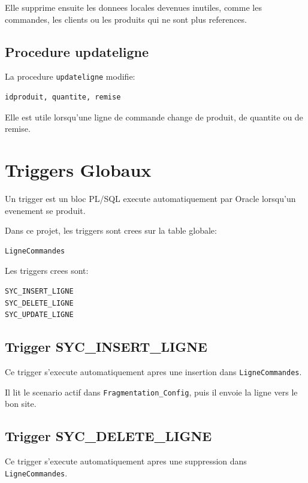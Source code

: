 \documentclass[12pt,a4paper]{report}
\begin{document}
Elle supprime ensuite les donnees locales devenues inutiles, comme les commandes, les clients ou les produits qui ne sont plus references.

\section{Procedure updateligne}

La procedure \texttt{updateligne} modifie:

\begin{lstlisting}[style=textstyle]
idproduit, quantite, remise
\end{lstlisting}

Elle est utile lorsqu'une ligne de commande change de produit, de quantite ou de remise.

\chapter{Triggers Globaux}

Un trigger est un bloc PL/SQL execute automatiquement par Oracle lorsqu'un evenement se produit.

Dans ce projet, les triggers sont crees sur la table globale:

\begin{lstlisting}[style=textstyle]
LigneCommandes
\end{lstlisting}

Les triggers crees sont:

\begin{lstlisting}[style=textstyle]
SYC_INSERT_LIGNE
SYC_DELETE_LIGNE
SYC_UPDATE_LIGNE
\end{lstlisting}

\section{Trigger SYC\_INSERT\_LIGNE}

Ce trigger s'execute automatiquement apres une insertion dans \texttt{LigneCommandes}.

Il lit le scenario actif dans \texttt{Fragmentation_Config}, puis il envoie la ligne vers le bon site.

\section{Trigger SYC\_DELETE\_LIGNE}

Ce trigger s'execute automatiquement apres une suppression dans \texttt{LigneCommandes}.
\end{document}
